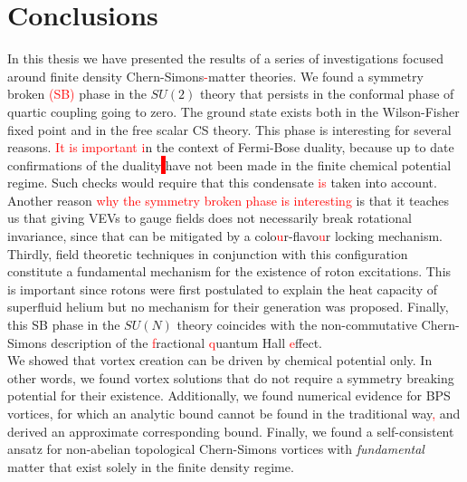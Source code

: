 
\chapter*{Conclusions}

    In this thesis we have presented the results of a series of investigations focused around finite density Chern-Simons\textcolor{red}{-}matter theories. We found a symmetry broken \textcolor{red}{(SB)} phase in the $SU(2)$ theory that persists in the conformal phase of quartic coupling going to zero. The ground state exists both in the Wilson-Fisher fixed point and in the free scalar CS theory. This phase is interesting for several reasons. \textcolor{red}{It is important i}n the context of Fermi-Bose duality, \colorbox{red}{ } because up to date confirmations of the duality\colorbox{red}{ } have not been made in the finite chemical potential regime. Such checks would require that this condensate \textcolor{red}{is} taken into account. Another reason \textcolor{red}{why the symmetry broken phase is interesting} is that it teaches us that giving VEVs to gauge fields does not necessarily break rotational invariance, since that can be mitigated by a colo\textcolor{red}{u}r-flavo\textcolor{red}{u}r locking mechanism. Thirdly, field theoretic techniques in conjunction with this configuration constitute a fundamental mechanism for the existence of roton excitations. This is important since \colorbox{red}{ } rotons were first postulated to explain the heat capacity of superfluid helium \textcolor{red}{\cite{PhysRev.60.356}} but no mechanism for their generation was proposed. Finally, this SB phase in the $SU(N)$ theory coincides with the non-commutative Chern-Simons description of the \textcolor{red}{f}ractional \textcolor{red}{q}uantum Hall \textcolor{red}{e}ffect.\\
    \indent We showed that vortex creation can be driven by chemical potential only. In other words, we found vortex solutions that do not require a symmetry breaking potential for their existence. Additionally, we found numerical evidence for BPS vortices, for which an analytic bound cannot be found in the traditional way\textcolor{red}{,} and derived an approximate corresponding bound. Finally, we found a self-consistent ansatz for non-abelian topological Chern-Simons vortices with \textit{fundamental} matter that exist solely in the finite density regime.\\
